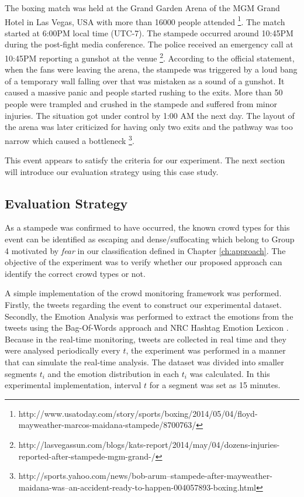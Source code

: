 The boxing match was held at the Grand Garden Arena of the MGM Grand Hotel in Las Vegas, USA with more than 16000 people attended \footnote{http://www.usatoday.com/story/sports/boxing/2014/05/04/floyd-mayweather-marcos-maidana-stampede/8700763/}. The match started at 6:00PM local time (UTC-7). The stampede occurred around 10:45PM during the post-fight media conference. The police received an emergency call at 10:45PM reporting a gunshot at the venue \footnote{http://lasvegassun.com/blogs/kats-report/2014/may/04/dozens-injuries-reported-after-stampede-mgm-grand-/}. According to the official statement, when the fans were leaving the arena, the stampede was triggered by a loud bang of a temporary wall falling over that was mistaken as a sound of a gunshot. It caused a massive panic and people started rushing to the exits. More than 50 people were trampled and crushed in the stampede and suffered from minor injuries. The situation got under control by 1:00 AM the next day. The layout of the arena was later criticized for having only two exits and the pathway was too narrow which caused a bottleneck \footnote{http://sports.yahoo.com/news/bob-arum--stampede-after-mayweather-maidana-was--an-accident-ready-to-happen-004057893-boxing.html}.

This event appears to satisfy the criteria for our experiment. The next section will introduce our evaluation strategy using this case study.

\subsection{Evaluation Strategy}

As a stampede was confirmed to have occurred, the known crowd types for this event can be identified as escaping and dense/suffocating which belong to Group 4 motivated by \textit{fear} in our classification defined in Chapter \ref{ch:approach}. The objective of the experiment was to verify whether our proposed approach can identify the correct crowd types or not.

A simple implementation of the crowd monitoring framework was performed. Firstly, the tweets regarding the event to construct our experimental dataset. Secondly, the Emotion Analysis was performed to extract the emotions from the tweets using the Bag-Of-Words approach and NRC Hashtag Emotion Lexicon \parencite{mohammad2014using}. Because in the real-time monitoring, tweets are collected in real time and they were analysed periodically every \(t\), the experiment was performed in a manner that can simulate the real-time analysis. The dataset was divided into smaller segments \(t_i\) and the emotion distribution in each \(t_i\) was calculated. In this experimental implementation, interval \(t\) for a segment was set as 15 minutes.

